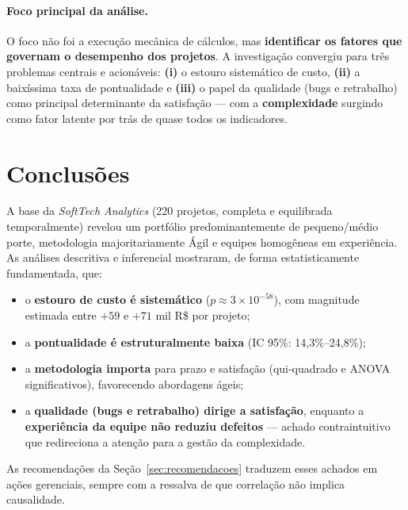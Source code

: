 \documentclass[a4paper, 12pt]{article}
\begin{document}
\paragraph{Foco principal da análise.}
O foco não foi a execução mecânica de cálculos, mas \textbf{identificar os fatores
que governam o desempenho dos projetos}. A investigação convergiu para três
problemas centrais e acionáveis: \textbf{(i)} o estouro sistemático de custo,
\textbf{(ii)} a baixíssima taxa de pontualidade e \textbf{(iii)} o papel da
qualidade (bugs e retrabalho) como principal determinante da satisfação ---
com a \textbf{complexidade} surgindo como fator latente por trás de quase todos
os indicadores.

\section{Conclusões}

A base da \emph{SoftTech Analytics} (220 projetos, completa e equilibrada
temporalmente) revelou um portfólio predominantemente de pequeno/médio porte,
metodologia majoritariamente Ágil e equipes homogêneas em experiência. As
análises descritiva e inferencial mostraram, de forma estatisticamente
fundamentada, que:

\begin{itemize}[noitemsep]
	\item o \textbf{estouro de custo é sistemático} ($p \approx 3\times10^{-58}$),
	      com magnitude estimada entre $+59$ e $+71$ mil R\$ por projeto;
	\item a \textbf{pontualidade é estruturalmente baixa} (IC 95\%: 14,3\%--24,8\%);
	\item a \textbf{metodologia importa} para prazo e satisfação (qui-quadrado e
	      ANOVA significativos), favorecendo abordagens ágeis;
	\item a \textbf{qualidade (bugs e retrabalho) dirige a satisfação}, enquanto a
	      \textbf{experiência da equipe não reduziu defeitos} --- achado
	      contraintuitivo que redireciona a atenção para a gestão da complexidade.
\end{itemize}

As recomendações da Seção~\ref{sec:recomendacoes} traduzem esses achados em ações
gerenciais, sempre com a ressalva de que correlação não implica causalidade.

\end{document}
